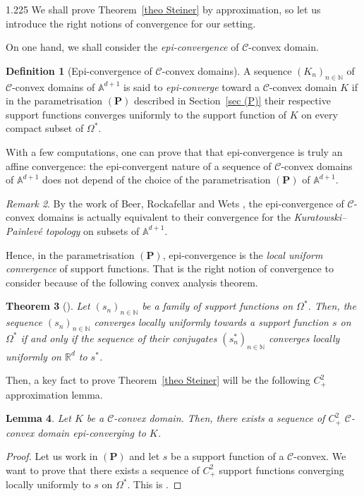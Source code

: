 \documentclass[reqno, a4paper]{amsart}
\numberwithin{equation}{section}
\numberwithin{figure}{section}
\newtheorem{theorem}{Theorem}[section]
\newtheorem{lemma}[theorem]{Lemma}
\theoremstyle{definition}
\newtheorem{definition}[theorem]{Definition}
\theoremstyle{remark}
\newtheorem{remark}[theorem]{Remark}
\newcommand{\R}{\mathbb{R}} %
\newcommand{\N}{\mathbb{N}} %
\newcommand{\A}{\mathbb{A}} %
\newcommand{\C}{\mathcal{C}} %
\begin{document}
\begin{spacing}{1.225}
We shall prove Theorem~\ref{theo Steiner} by approximation, so let us introduce the right notions of convergence for our setting. 


On one hand, we shall consider the \emph{epi-convergence} of $\C$-convex domain. 

\begin{definition}[Epi-convergence of $\C$-convex domains]
\label{def epi-convergence}
A sequence $(K_n)_{n\in \N} $ of $\C$-convex domains of $\A^{d+1}$ is said to \emph{epi-converge} toward a $\C$-convex domain $K$ if in the parametrisation $(\mathbf{P})$ described in Section~\ref{sec (P)} their respective support functions converges uniformly to the support function of $K$ on every compact subset of $\Omega^*$.
\end{definition}

With a few computations, one can prove that that epi-convergence is truly an affine convergence: the epi-convergent nature of a sequence of $\C$-convex domains of $\A^{d+1}$ does not depend of the choice of the parametrisation $(\mathbf{P})$ of $\A^{d+1}$.

\begin{remark}
By the work of Beer, Rockafellar and Wets \cite{Beer_Rock_Wets_92}, the epi-convergence of $\C$-convex domains is actually equivalent to their convergence for the \emph{Kuratowski--Painlev\'e topology} on subsets of $\A^{d+1}$.
\end{remark}

Hence, in the parametrisation $(\mathbf{P})$, epi-convergence is the \emph{local uniform convergence} of support functions. That is the right notion of convergence to consider because of the following convex analysis theorem. 

\begin{theorem}[{\cite[Theorems 7.17 and 11.34]{Rockafellar_Wets_98}}]
\label{theo cv iff cv*}
Let $(s_n)_{n\in \N}$ be a family of support functions on $\Omega^*$. Then, the sequence $(s_n)_{n\in \N}$ converges locally uniformly towards a support function $s$ on $\Omega^*$ if and only if the sequence of their conjugates $(s_n^*)_{n\in \N}$ converges locally uniformly on $\R^d$ to $s^*$. 
\end{theorem}

Then, a key fact to prove Theorem~\ref{theo Steiner} will be the following $C^2_+$ approximation lemma. 

\begin{lemma}
\label{lem approx}
Let $K$ be a $\C$-convex domain. Then, there exists a sequence of $C^2_+$ $\C$-convex domain epi-converging to $K$.
\end{lemma}
\begin{proof}
Let us work in $(\mathbf{P})$ and let $s$ be a support function of a $\C$-convex. We want to prove that there exists a sequence of $C^2_+$ support functions converging locally uniformly to $s$ on $\Omega^*$. This is {\cite[Lemma~2.16]{Bonsante_Fillastre_17}}.
\end{proof}


\end{spacing}
\end{document}
